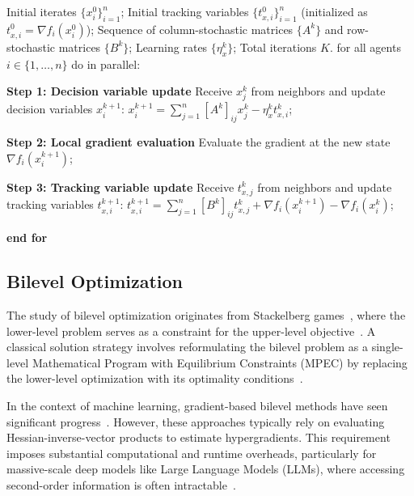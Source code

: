\documentclass{article}
\theoremstyle{plain}
\theoremstyle{definition}
\theoremstyle{remark}
\begin{document}
\begin{algorithm}[h]
	\caption{Push-Pull (TV-$\mathcal{AB}$) Algorithm} \label{Alg_AB}
	\label{alg2}
	\begin{algorithmic}[1]
		 Initial iterates $\{x_{i}^{0}\}_{i=1}^n$; 
        Initial tracking variables $\{t_{x,i}^{0}\}_{i=1}^n$ (initialized as $t_{x, i}^0 = \nabla f_i(x_i^0)$); 
        Sequence of column-stochastic matrices $\{A^{k}\}$ and row-stochastic matrices $\{B^{k}\}$; 
        Learning rates $\{\eta_{x}^{k}\}$; 
        Total iterations $K$.
		    \STATE for all agents $i \in \{1,\ldots,n\}$ do in parallel:
		    
		        \STATE \quad \textbf{Step 1: Decision variable update}
		        \STATE \quad Receive $x_j^k$ from neighbors and update decision variables $x_{i}^{k+1}$:
                \STATE \quad $x_{i}^{k+1} = \sum_{j=1}^n [A^k]_{ij} x_{j}^{k} - \eta_{x}^k t_{x,i}^{k}$; 
		        
		        \STATE \quad \textbf{Step 2: Local gradient evaluation}
		        \STATE \quad Evaluate the gradient at the new state $\nabla f_i(x_{i}^{k+1})$;

                \STATE \quad \textbf{Step 3: Tracking variable update}
                \STATE \quad Receive $t_{x,j}^k$ from neighbors and update tracking variables $t_{x,i}^{k+1}$:
                \STATE \quad $t_{x,i}^{k+1} = \sum_{j=1}^n [B^k]_{ij} t_{x,j}^{k} + \nabla f_i(x_{i}^{k+1}) - \nabla f_i(x_{i}^{k})$; 
                
		    \STATE \textbf{end for}
		\ENDFOR
	\end{algorithmic}
\end{algorithm}

\subsection{Bilevel Optimization} 
\label{app:bilevel}
The study of bilevel optimization originates from Stackelberg games~\cite{von1952theory}, where the lower-level problem serves as a constraint for the upper-level objective~\cite{BrackenOR1973, Ye1995, Colson2007overview}. 
A classical solution strategy involves reformulating the bilevel problem as a single-level Mathematical Program with Equilibrium Constraints (MPEC) by replacing the lower-level optimization with its optimality conditions~\cite{Fukushima1998MPEC,luo1996mathematical,LVMPEC2011}.

In the context of machine learning, gradient-based bilevel methods have seen significant progress~\cite{LiaoAID2018, MeilaAID2021,ChaudhuriITD2019,LiuITD2021,HongIAID2023}. 
However, these approaches typically rely on evaluating Hessian-inverse-vector products to estimate hypergradients. 
This requirement imposes substantial computational and runtime overheads, particularly for massive-scale deep models like Large Language Models (LLMs), where accessing second-order information is often intractable~\cite{Pearlmutter1994,MathieuBLOG2024}.
\end{document}
